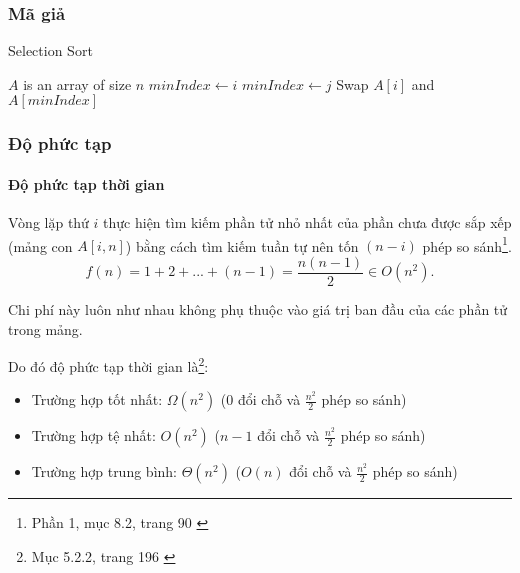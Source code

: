 \subsubsection{Mã giả}
 
\begin{algorithm}
\caption{Selection Sort}
\label{alg:selection-sort}
\begin{algorithmic}

\Require $A$ is an array of size $n$
    \State $minIndex \gets i$ 
            \State $minIndex \gets j$ 
        \EndIf
    \EndFor
    \State Swap $A[i]$ and $A[minIndex]$ 
\EndFor
\EndFunction

\end{algorithmic}
\end{algorithm}

\subsubsection{Độ phức tạp}

\paragraph{Độ phức tạp thời gian}
Vòng lặp thứ $i$ thực hiện tìm kiếm phần tử nhỏ nhất của phần chưa được sắp xếp (mảng con $A[i,n]$) bằng cách tìm kiếm tuần tự nên tốn $(n-i)$ phép so sánh\footnote{Phần 1, mục 8.2, trang 90 \cite{hoang1999giaithuat}
}.
$$f(n) = 1 + 2 + ... + (n-1) = \frac{n(n-1)}{2} \in O(n^2).$$ 

Chi phí này luôn như nhau không phụ thuộc vào giá trị ban đầu của các phần tử trong mảng.

Do đó độ phức tạp thời gian là\footnote{Mục 5.2.2, trang 196 \cite{dsa_nghia_2013}}:

\begin{itemize}
    \item Trường hợp tốt nhất: $\Omega(n^2)$ (0 đổi chỗ và $\frac{n^2}{2}$ phép so sánh)
    \item Trường hợp tệ nhất: $O(n^2)$ ($n-1$ đổi chỗ và $\frac{n^2}{2}$ phép so sánh)
    \item Trường hợp trung bình: $\Theta(n^2)$ ($O(n)$ đổi chỗ và $\frac{n^2}{2}$ phép so sánh)
\end{itemize}


